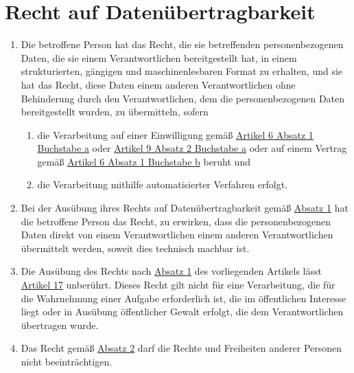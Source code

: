 \chapter{Recht auf Datenübertragbarkeit}
\label{ch:20}


\begin{enumerate}

  \item Die betroffene Person hat das Recht, die sie betreffenden personenbezogenen Daten, die sie einem
   Verantwortlichen bereitgestellt hat, in einem strukturierten, gängigen und maschinenlesbaren Format zu erhalten, und
   sie hat das Recht, diese Daten einem anderen Verantwortlichen ohne Behinderung durch den Verantwortlichen, dem die
   personenbezogenen Daten bereitgestellt wurden, zu übermitteln, sofern
  \label{itm:20-1}

  \begin{enumerate}
  
    \item die Verarbeitung auf einer Einwilligung gemäß \hyperref[itm:06-1a]{Artikel 6 Absatz 1 Buchstabe a} oder
    \hyperref[itm:09-2a]{Artikel 9 Absatz 2 Buchstabe a} oder auf einem Vertrag gemäß \hyperref[itm:06-1b]{Artikel 6
     Absatz 1 Buchstabe b} beruht und
  \label{itm:20-1a}

    \item die Verarbeitung mithilfe automatisierter Verfahren erfolgt.
  \label{itm:20-1b}

  \end{enumerate}

  \item Bei der Ausübung ihres Rechts auf Datenübertragbarkeit gemäß \hyperref[itm:20-1]{Absatz 1} hat die betroffene
   Person das Recht, zu erwirken, dass die personenbezogenen Daten direkt von einem Verantwortlichen einem anderen
   Verantwortlichen übermittelt werden, soweit dies technisch machbar ist.
  \label{itm:20-2}

  \item Die Ausübung des Rechts nach \hyperref[itm:20-1]{Absatz 1} des vorliegenden Artikels lässt \hyperref[ch:17]
   {Artikel 17} unberührt. Dieses Recht gilt nicht für eine Verarbeitung, die für die Wahrnehmung einer Aufgabe
   erforderlich ist, die im öffentlichen Interesse liegt oder in Ausübung öffentlicher Gewalt erfolgt, die dem
   Verantwortlichen übertragen wurde.
  \label{itm:20-3}

  \item Das Recht gemäß \hyperref[itm:20-2]{Absatz 2} darf die Rechte und Freiheiten anderer Personen nicht
   beeinträchtigen.
  \label{itm:20-4}

\end{enumerate}


